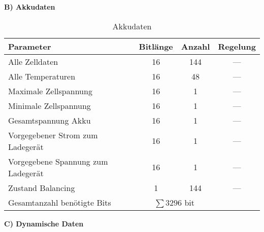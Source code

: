 \documentclass[fontsize = 12pt, paper = a4]{scrreprt}
\begin{document}
\vspace{\baselineskip}


\textbf{B) Akkudaten} 

\begin{table}[h]
\caption{Akkudaten}

\begin{tabular}{ l | c | c | c }

\toprule[1.5pt]
\textbf{Parameter} & \textbf{Bitlänge} & \textbf{Anzahl} & \textbf{Regelung} \\ 

\midrule
Alle Zelldaten                       & 16 & 144 & --- \\
Alle Temperaturen                    & 16 & 48  & --- \\
Maximale Zellspannung                & 16 & 1   & --- \\
Minimale Zellspannung                & 16 & 1   & --- \\
Gesamtspannung Akku                  & 16 & 1   & --- \\
Vorgegebener Strom zum Ladegerät     & 16 & 1   & --- \\
Vorgegebene Spannung zum Ladegerät   & 16 & 1   & --- \\
Zustand \gls{Balancing}              & 1  & 144 & --- \\

\midrule
Gesamtanzahl benötigte Bits & \multicolumn{2}{c}{$\sum 3296$ bit} \\

\bottomrule[1.5pt]

\end{tabular}

\label{Akkudaten}
\end{table}

\newpage

\vspace{\baselineskip}


\textbf{C) Dynamische Daten} 
\end{document}
